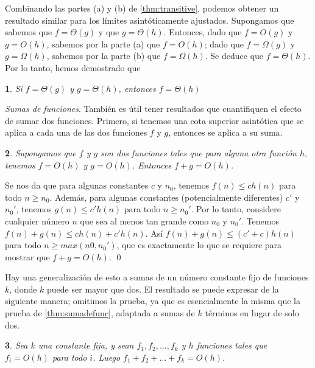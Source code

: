 \documentclass[a4paper, 12pt]{book}
\theoremstyle{dotless}
\newtheorem{theorem}{}%
\renewenvironment{proof}{{\noindent\bfseries Demostración.}}{\qed\vspace{12pt}}
\begin{document}
Combinando las partes (a) y (b) de \ref{thm:transitive}, podemos obtener un resultado similar para los límites asintóticamente ajustados. Supongamos que sabemos que $f=\Theta(g)$ y que $g=\Theta(h)$. Entonces, dado que $f=O(g)$ y $g=O(h)$, sabemos por la parte (a) que $f=O(h)$; dado que $f=\Omega(g)$ y $g=\Omega(h)$, sabemos por la parte (b) que $f=\Omega(h)$. Se deduce que $f=\Theta(h)$. Por lo tanto, hemos demostrado que

\begin{theorem}
Si $f=\Theta(g)$ y $g=\Theta(h)$, entonces $f=\Theta(h)$
\end{theorem}

\textit{Sumas de funciones}. También es útil tener resultados que cuantifiquen el efecto de sumar dos funciones. Primero, si tenemos una cota superior asintótica que se aplica a cada una de las dos funciones $f$ y $g$, entonces se aplica a su suma.

\begin{theorem}
\label{thm:sumadedosfunc}
Supongamos que $f$ y $g$ son dos funciones tales que para alguna otra función $h$, tenemos $f = O(h)$ y $g = O(h)$. Entonces $f + g = O (h)$.
\end{theorem}

\begin{proof}
Se nos da que para algunas constantes $c$ y $n_0$, tenemos $f(n)≤ch(n)$ para todo $n≥n_0$. Además, para algunas constantes (potencialmente diferentes) $c'$ y $n_0'$, tenemos $g(n)≤c'h(n)$ para todo $n≥n_0'$. Por lo tanto, considere cualquier número $n$ que sea al menos tan grande como $n_0$ y $n_0'$. Tenemos $f(n) + g (n) ≤ ch (n) + c'h (n)$. Así $f (n) + g (n) ≤ (c' + c) h (n)$ para todo $n≥max(n0, n_0')$, que es exactamente lo que se requiere para mostrar que $f + g = O (h)$.
\end{proof}

Hay una generalización de esto a sumas de un número constante fijo de funciones $k$, donde $k$ puede ser mayor que dos. El resultado se puede expresar de la siguiente manera; omitimos la prueba, ya que es esencialmente la misma que la prueba de \ref{thm:sumadefunc}, adaptada a sumas de $k$ términos en lugar de solo dos.

\begin{theorem}
\label{thm:sumadekfunc}
Sea $k$ una constante fija, y sean $f_1, f_2, ..., f_k$ y $h$  funciones tales que $f_i = O(h)$ para todo $i$. Luego $f_1 + f_2 + ... + f_k = O (h)$.
\end{theorem}
\end{document}
